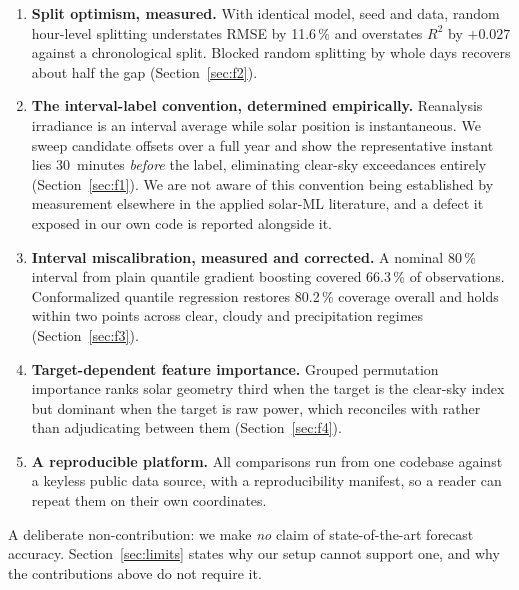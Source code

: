 \documentclass[conference]{IEEEtran}
\begin{document}
\begin{enumerate}
  \item \textbf{Split optimism, measured.} With identical model, seed
    and data, random hour-level splitting understates RMSE by
    11.6\,\% and overstates $R^{2}$ by $+0.027$ against a chronological
    split. Blocked random splitting by whole days recovers about half
    the gap (Section~\ref{sec:f2}).

  \item \textbf{The interval-label convention, determined
    empirically.} Reanalysis irradiance is an interval average while
    solar position is instantaneous. We sweep candidate offsets over a
    full year and show the representative instant lies 30~minutes
    \emph{before} the label, eliminating clear-sky exceedances entirely
    (Section~\ref{sec:f1}). We are not aware of this convention being
    established by measurement elsewhere in the applied
    solar-ML literature, and a defect it exposed in our own code is
    reported alongside it.

  \item \textbf{Interval miscalibration, measured and corrected.}
    A nominal 80\,\% interval from plain quantile gradient boosting
    covered 66.3\,\% of observations. Conformalized quantile regression
    \cite{romano2019} restores 80.2\,\% coverage overall and holds
    within two points across clear, cloudy and precipitation regimes
    (Section~\ref{sec:f3}).

  \item \textbf{Target-dependent feature importance.} Grouped
    permutation importance ranks solar geometry third when the target
    is the clear-sky index but dominant when the target is raw power,
    which reconciles \cite{P5} with \cite{P2} rather than adjudicating
    between them (Section~\ref{sec:f4}).

  \item \textbf{A reproducible platform.} All comparisons run from one
    codebase against a keyless public data source, with a
    reproducibility manifest, so a reader can repeat them on their own
    coordinates.
\end{enumerate}

A deliberate non-contribution: we make \emph{no} claim of
state-of-the-art forecast accuracy. Section~\ref{sec:limits} states why
our setup cannot support one, and why the contributions above do not
require it.

\end{document}
